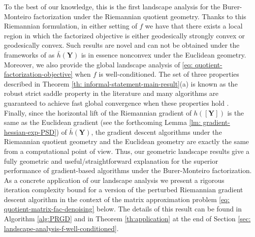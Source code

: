 \documentclass[11pt]{article}
\newcommand{\0}{{\mathbf{0}}}
\newcommand{\1}{{\mathbf{1}}}
\newcommand{\Y}{{\mathbf{Y}}}
\newcommand{\nc}{\normalcolor}
\begin{document}
To the best of our knowledge, this is the first landscape analysis for the Burer-Monteiro factorization under the Riemannian quotient geometry. Thanks to this Riemannian formulation, in either setting of $f$ we have that there exists a local region in which the factorized objective is either geodesically strongly convex or geodesically convex. Such results are novel and can not be obtained under the frameworks of \cite{li2016symmetry,zhu2017global} as $\bar{h}(\Y)$ is in essence nonconvex under the Euclidean geometry. Moreover, we also provide the global landscape analysis of \eqref{eq: quotient-factorization-objective} when $f$ is well-conditioned. The set of three properties described in Theorem \ref{th: informal-statement-main-result}(a) is known as the robust strict saddle property in the literature \cite{ge2015escaping,jin2017escape,sun2015nonconvex} and many algorithms are guaranteed to achieve fast global convergence when these properties hold \cite{sun2019escaping,criscitiello2019efficiently,ge2015escaping,jin2017escape,sun2018geometric}. Finally, since the horizontal lift of the Riemannian gradient of $h([\Y])$ is the same as the Euclidean gradient (see the forthcoming Lemma \ref{lm: gradient-hessian-exp-PSD}) of $\bar{h}(\Y)$\nc, the gradient descent algorithms under the Riemannian quotient geometry and the Euclidean geometry are exactly the same from a  computational point of view. Thus, our geometric landscape results give a fully geometric and useful/straightforward explanation for the superior performance of gradient-based algorithms under the Burer-Monteiro factorization. As a concrete application of our landscape analysis we present a rigorous iteration complexity bound for a version of the perturbed Riemannian gradient descent algorithm \cite{criscitiello2019efficiently,sun2019escaping}
in the context of the matrix approximation problem \eqref{eq: quotient-matrix-fac-denoising} below. The details of this result can be found in Algorithm \ref{alg:PRGD} and in Theorem \ref{th:application} at the end of Section \ref{sec: landscape-analysis-f-well-conditioned}. \nc
\end{document}
